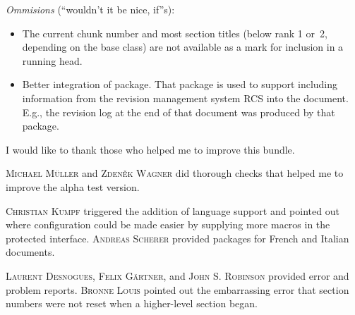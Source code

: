 {\begin{itemize}
\end{itemize}

\noindent \textit{Ommisions} (``wouldn't it be nice, if''s):
\begin{itemize}

\item The current chunk number and most section titles (below rank 1
  or~2, depending on the base class) are not available as a mark for
  inclusion in a running head.

\item Better integration of  package. That package is used to
  support including information from the revision management system
  RCS into the document. E.g., the revision log at the end of that
  document was produced by that package.

\end{itemize}


\sect I would like to thank those who helped me to improve this bundle.

\textsc{Michael M\"uller} and \textsc{Zden\v{e}k Wagner} did thorough
checks that helped me to improve the alpha test version.

\textsc{Christian Kumpf} triggered the addition of language support
and pointed out where configuration could be made easier by supplying
more macros in the protected interface. \textsc{Andreas Scherer}
provided packages for French and Italian \cweb{} documents.

\textsc{Laurent Desnogues},
\textsc{Felix G\"artner},
and
\textsc{John S. Robinson}
provided error and problem reports.
\textsc{Bronne Louis} pointed out the embarrassing error that section
numbers were not reset when a higher-level section began.



\endSubDocument



\newpage

}
